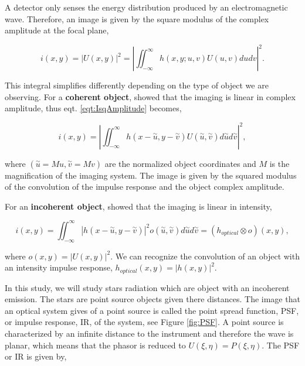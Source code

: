 A detector only senses the energy distribution produced by an electromagnetic wave. Therefore, an image is given by the square modulus of the complex amplitude at the focal plane,

\begin{equation}
i(x,y) = |U(x,y)|^2 = |\iint_{-\infty}^{\infty} h(x,y;u,v)U(u,v)dudv|^2.
\label{eqt:IsqAmplitude}
\end{equation}

This integral simplifies differently depending on the type of object we are observing. For a \textbf{coherent object}, \citet[Chapter 6.2]{goodman_1968} showed that the imaging is linear in complex amplitude, thus eqt. \eqref{eqt:IsqAmplitude} becomes,

\begin{equation}
i(x,y) = |\iint_{-\infty}^{\infty} h(x-\overset{\sim}{u},y-\overset{\sim}{v})U(\overset{\sim}{u},\overset{\sim}{v})d\overset{\sim}{u}d\overset{\sim}{v}|^2,
\label{eqt:convolution_hUo}
\end{equation}

where $(\overset{\sim}{u} = Mu,\overset{\sim}{v}= Mv)$ are the normalized object coordinates and $M$ is the magnification of the imaging system. The image is given by the squared modulus of the convolution of the impulse response and the object complex amplitude.

For an \textbf{incoherent object},  \citet[Chapter 6.2]{goodman_1968} showed that the imaging is linear in intensity,

\begin{equation}
i(x,y) = \iint_{-\infty}^{\infty}|h(x-\overset{\sim}{u},y-\overset{\sim}{v})|^2o(\overset{\sim}{u},\overset{\sim}{v})d\overset{\sim}{u}d\overset{\sim}{v} = (h_{optical}\otimes o)(x,y),
\label{eqt:imageObjectrel}
\end{equation}

where $o(x,y) = |U(x,y)|^2$. We can recognize the convolution of an object with an intensity impulse response, $h_{optical}(x,y) = |h(x,y)|^2$.

In this study, we will study stars radiation which are object with an incoherent emission. The stars are point source objects given there distances. The image that an optical system gives of a point source is called the point spread function, PSF, or impulse response, IR, of the system, see Figure \ref{fig:PSF}. A point source is characterized by an infinite distance to the instrument and therefore the wave is planar, which means that the phasor is reduced to $U(\xi,\eta) = P(\xi,\eta)$. The PSF or IR is given by,

